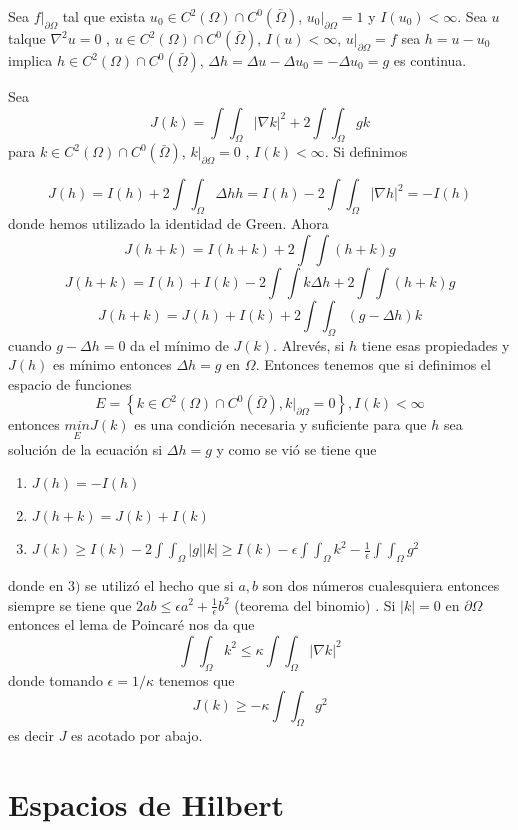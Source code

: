 \documentclass[a4paper,10pt]{book}
\begin{document}
Sea $f|_{\partial \Omega}$ tal que exista $u_0 \in C^2(\Omega) \cap  C^0(\bar{\Omega}) $, $u_0|_{\partial \Omega}=1$ y $I(u_0)< \infty$.
Sea $u$ talque $\nabla^2 u=0$ , $u\in C^2(\Omega)\cap C^0(\bar{\Omega})$, $I(u)<\infty$, $u|_{\partial \Omega}=f$ sea 
$h=u-u_0$ implica $h \in C^2(\Omega) \cap  C^0(\bar{\Omega})$, $\Delta h=\Delta u-\Delta u_0=-\Delta u_0=g$  es continua. 

Sea 
\[J(k)=\int\int_\Omega| \nabla k|^2  + 2\int \int_\Omega gk \]
para $k\in C^2 (\Omega)\cap C^0(\bar{\Omega}) $, $k|_{\partial \Omega}=0$ , $I(k)<\infty$. Si definimos

\[J(h)=I(h)+2 \int\int_\Omega \Delta h h  = I(h) -2\int \int_\Omega | \nabla h |^2 = -I(h)\]
donde hemos utilizado la identidad de Green. Ahora 
\[J(h+k)= I(h+k)+2\int \int (h+k)g  \]
\[J(h+k)= I(h)+I(k) -2 \int \int k \Delta h+2\int \int  (h+k)g \]
\[J(h+k)=J(h) +I(k)+2 \int\int_\Omega( g-\Delta h )k \]
cuando $g-\Delta h =0$ da el m\'inimo  de $J(k)$. Alrev\'es,  si $h$ tiene esas propiedades y $J(h)$ es
m\'inimo entonces $\Delta h=g$ en $\Omega$. Entonces tenemos que si definimos el espacio de funciones
\[E=\left\lbrace k\in C^2 (\Omega) \cap C^0(\bar{\Omega} ), k|_{\partial \Omega}=0 \right\rbrace, I(k)<\infty\]
entonces $  \underset{E}{min} J(k)$  es una condici\'on necesaria y suficiente para que $h$ 
sea soluci\'on de la ecuaci\'on si $\Delta h=g$ y como se vi\'o se tiene que

\begin{enumerate}
\item $J(h)=-I(h)$
\item $J(h+k)= J(k)+I(k)$
\item $J(k)\geq I(k)-2\int\int_\Omega |g||k| \geq I(k) - \epsilon \int\int_\Omega k^2 -\frac{1}{\epsilon} \int\int_\Omega g^2 $
\end{enumerate}
donde en $3)$ se utiliz\'o el hecho que si $a,b$ son dos n\'umeros cualesquiera entonces siempre se tiene
que  $2ab\leq \epsilon a^2 +\frac{1}{\epsilon} b^2 $ (teorema del binomio) . Si $|k|=0$ en $\partial\Omega$ entonces el lema de Poincar\'e
nos da que 
\[ \int\int_\Omega k^2 \leq \kappa \int\int_\Omega |\nabla k|^2\]
donde tomando  $\epsilon=1/\kappa$ tenemos que
\[J(k)\geq -\kappa \int\int_\Omega g^2 \]
es decir $J$ es acotado por abajo.


\chapter{Espacios de Hilbert}
\end{document}
